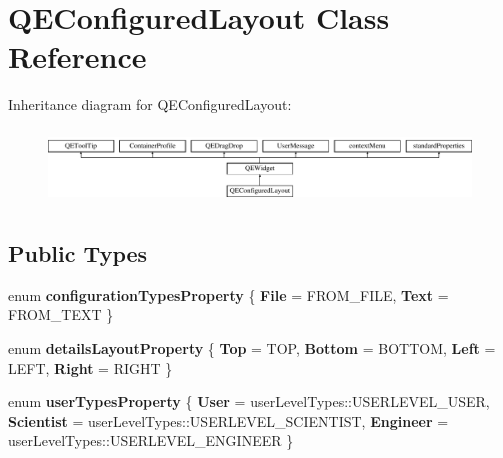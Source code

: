 \hypertarget{classQEConfiguredLayout}{
\section{QEConfiguredLayout Class Reference}
\label{classQEConfiguredLayout}
}
Inheritance diagram for QEConfiguredLayout:\begin{figure}[H]
\begin{center}
\leavevmode
\includegraphics[height=2.014389cm]{classQEConfiguredLayout}
\end{center}
\end{figure}
\subsection*{Public Types}
\begin{DoxyCompactItemize}
\item 
enum {\bfseries configurationTypesProperty} \{ {\bfseries File} =  FROM\_\-FILE, 
{\bfseries Text} =  FROM\_\-TEXT
 \}
\item 
enum {\bfseries detailsLayoutProperty} \{ {\bfseries Top} =  TOP, 
{\bfseries Bottom} =  BOTTOM, 
{\bfseries Left} =  LEFT, 
{\bfseries Right} =  RIGHT
 \}
\item 
enum {\bfseries userTypesProperty} \{ {\bfseries User} =  userLevelTypes::USERLEVEL\_\-USER, 
{\bfseries Scientist} =  userLevelTypes::USERLEVEL\_\-SCIENTIST, 
{\bfseries Engineer} =  userLevelTypes::USERLEVEL\_\-ENGINEER
 \}
\end{DoxyCompactItemize}
